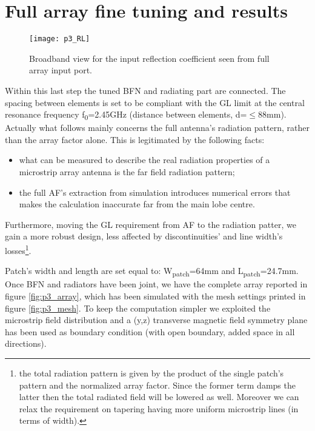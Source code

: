 \newpage
\section{Full array fine tuning and results}

\begin{figure}[t] 
	\centering
	\texttt{[image: p3\_RL]}
	\caption{Broadband view for the input reflection coefficient seen from full array input port.}
	\label{fig:p3_scattering}
\end{figure}
Within this last step the tuned BFN and radiating part are connected. The spacing between elements is set to be compliant with the GL limit at the central resonance frequency f\textsubscript{0}=2.45GHz (distance between elements, d=$\leq$88mm). 
Actually what follows mainly concerns the full antenna's radiation pattern, rather than the array factor alone. This is legitimated by the following facts:
\begin{itemize}
	\item what can be measured to describe the real radiation properties of a microstrip array antenna is the far field radiation pattern;
	\item the full AF's extraction from simulation introduces numerical errors that makes the calculation inaccurate far from the main lobe centre.
\end{itemize}
Furthermore,  moving the GL requirement from AF to the radiation patter, we gain a more robust design, less affected by discontinuities' and line width's losses\footnote{the total radiation pattern is given by the product of the single patch's pattern and the normalized array factor. Since the former term damps the latter then the total radiated field will be lowered as well. Moreover we can relax the requirement on tapering having more uniform microstrip lines (in terms of width).}.  

Patch's width and length are set equal to: W\textsubscript{patch}=64mm and L\textsubscript{patch}=24.7mm. Once BFN and radiators have been joint, we have the complete array reported in figure \ref{fig:p3_array}, which has been simulated with the mesh settings printed in figure \ref{fig:p3_mesh}. To keep the computation simpler we exploited the microstrip field distribution and a (y,z) transverse magnetic field symmetry plane has been used as boundary condition (with open boundary, added space in all directions).


